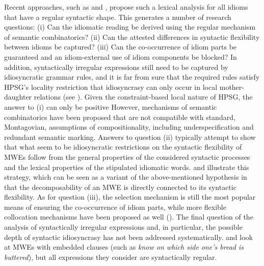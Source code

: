 \documentclass[output=paper]{langsci/langscibook}
\begin{document}
Recent approaches, such as \citet{kaysagidioms} and 
,
propose such a lexical analysis for all idioms that have a regular syntactic shape. This generates a number of research questions: (i) Can the idiomatic reading be derived using the regular mechanism of semantic combinatorics? (ii) Can the attested differences in syntactic flexibility between idioms be captured? (iii) Can the co-occurrence of idiom parts be guaranteed and an idiom-external use of idiom components be blocked? In addition, syntactically irregular expressions still need to be captured by idiosyncratic grammar rules, and it is far from sure that the required rules satisfy HPSG’s locality restriction that idiosyncrasy can only occur in local mother-daughter relations (see \citealt{Sailer:12}).
Given the constraint-based local nature of HPSG, the answer to (i) can only be positive However, mechanisms of semantic combinatorics have been proposed that are not compatible with standard,   Montagovian, assumptions of  compositionality, including underspecification and redundant semantic marking. 
Answers to question (ii) typically attempt to show that what seem to be idiosyncratic restrictions on the syntactic flexibility of MWEs follow from the general properties of the considered syntactic processes and the lexical properties of the stipulated idiomatic words. \citet{kaysagidioms} and 
illustrate this strategy, which can be seen as a variant of the above-mentioned hypothesis in \citet{Nunberg1994}  that the decomposability  of an MWE is directly connected to its  syntactic flexibility. 
As for question (iii), the selection mechanism is still the most popular means of ensuring the co-occurrence of idiom parts, while more flexible collocation mechanisms have been proposed as well (\citealt{Sailer:03, Soehn:09}). The final question of the analysis of syntactically irregular expressions and, in particular, the possible depth of syntactic idiosyncrasy has not been addressed systematically. \citet{Richter:Sailer:14} and \citet{kaysagidioms} look at MWEs with embedded clauses (such as \textit{know on which side one’s bread is buttered}), but all expressions they consider are syntactically regular. 

\end{document}
